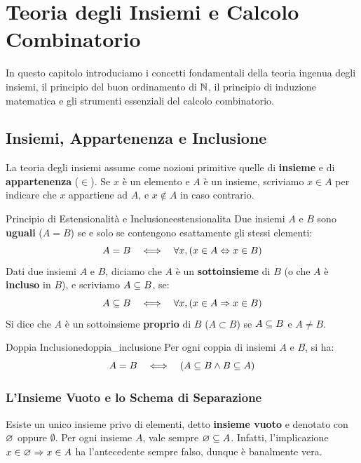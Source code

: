 \chapter{Teoria degli Insiemi e Calcolo Combinatorio}
\label{chap:insiemi_combinatoria}

In questo capitolo introduciamo i concetti fondamentali della teoria ingenua degli insiemi, il principio del buon ordinamento di $\mathbb{N}$, il principio di induzione matematica e gli strumenti essenziali del calcolo combinatorio.

\section{Insiemi, Appartenenza e Inclusione}

La teoria degli insiemi assume come nozioni primitive quelle di \textbf{insieme} e di \textbf{appartenenza} ($\in$). Se $x$ è un elemento e $A$ è un insieme, scriviamo $x \in A$ per indicare che $x$ appartiene ad $A$, e $x \notin A$ in caso contrario.

\begin{definizione}{Principio di Estensionalità e Inclusione}{estensionalita}
Due insiemi $A$ e $B$ sono \textbf{uguali} ($A = B$) se e solo se contengono esattamente gli stessi elementi:
\[
    A = B \quad \Longleftrightarrow \quad \forall x, (x \in A \Leftrightarrow x \in B)
\]
Dati due insiemi $A$ e $B$, diciamo che $A$ è un \textbf{sottoinsieme} di $B$ (o che $A$ è \textbf{incluso} in $B$), e scriviamo $A \subseteq B$, se:
\[
    A \subseteq B \quad \Longleftrightarrow \quad \forall x, (x \in A \Rightarrow x \in B)
\]
Si dice che $A$ è un sottoinsieme \textbf{proprio} di $B$ ($A \subset B$) se $A \subseteq B$ e $A \neq B$.
\end{definizione}

\begin{proposizione}{Doppia Inclusione}{doppia_inclusione}
Per ogni coppia di insiemi $A$ e $B$, si ha:
\[
    A = B \quad \Longleftrightarrow \quad (A \subseteq B \wedge B \subseteq A)
\]
\end{proposizione}

\subsection{L'Insieme Vuoto e lo Schema di Separazione}
Esiste un unico insieme privo di elementi, detto \textbf{insieme vuoto} e denotato con $\varnothing$ oppure $\emptyset$.
Per ogni insieme $A$, vale sempre $\varnothing \subseteq A$. Infatti, l'implicazione $x \in \varnothing \Rightarrow x \in A$ ha l'antecedente sempre falso, dunque è banalmente vera.


